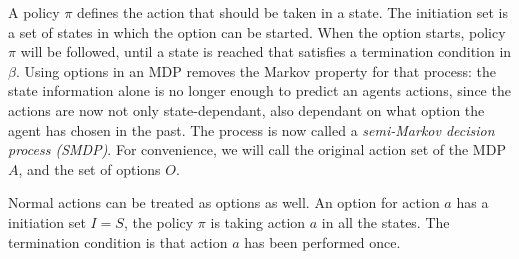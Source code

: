 A policy $\pi$ defines the action that should be taken in a state. The
initiation set is a set of states in which the option can be started. When the
option starts, policy $\pi$ will be followed, until a state is reached that
satisfies a termination condition in $\beta$. Using options in an MDP removes
the Markov property for that process: the state information alone is no longer
enough to predict an agents actions, since the actions are now not only
state-dependant, also dependant on what option the agent has chosen in the past.
The process is now called a \emph{semi-Markov decision process (SMDP)}. For
convenience, we will call the original action set of the MDP $A$, and the set of
options $O$.

Normal actions can be treated as options as well. An option for action $a$ has a
initiation set $I = S$, the policy $\pi$ is taking action $a$ in all the states.
The termination condition is that action $a$ has been performed once.
